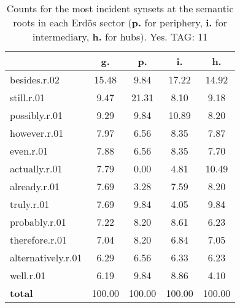 \begin{table}[h!]
\begin{center}
\begin{tabular}{| l || c | c | c | c |}\hline
 & {\bf g.} & {\bf p.} & {\bf i.} & {\bf h.} \\\hline\hline
besides.r.02 & 15.48  & 9.84  & 17.22  & 14.92 \\\hline
still.r.01 & 9.47  & 21.31  & 8.10  & 9.18 \\\hline
possibly.r.01 & 9.29  & 9.84  & 10.89  & 8.20 \\\hline
however.r.01 & 7.97  & 6.56  & 8.35  & 7.87 \\\hline
even.r.01 & 7.88  & 6.56  & 8.35  & 7.70 \\\hline
actually.r.01 & 7.79  & 0.00  & 4.81  & 10.49 \\\hline
already.r.01 & 7.69  & 3.28  & 7.59  & 8.20 \\\hline
truly.r.01 & 7.69  & 9.84  & 4.05  & 9.84 \\\hline
probably.r.01 & 7.22  & 8.20  & 8.61  & 6.23 \\\hline
therefore.r.01 & 7.04  & 8.20  & 6.84  & 7.05 \\\hline
alternatively.r.01 & 6.29  & 6.56  & 6.33  & 6.23 \\\hline
well.r.01 & 6.19  & 9.84  & 8.86  & 4.10 \\\hline\hline
{{\bf total}} & 100.00  & 100.00  & 100.00  & 100.00 \\\hline
\end{tabular}
\caption{Counts for the most incident synsets at the semantic roots in each Erd\"os sector ({\bf p.} for periphery, {\bf i.} for intermediary, {\bf h.} for hubs). Yes. TAG: 11}
\end{center}
\end{table}